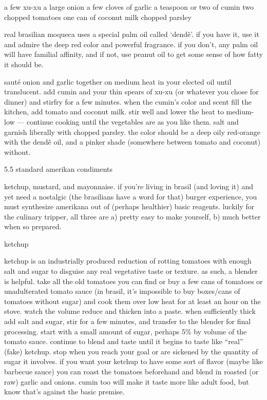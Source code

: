 a few xu-xu
a large onion
a few cloves of garlic
a teaspoon or two of cumin
two chopped tomatoes
one can of coconut milk
chopped parsley

	real brasilian moqueca uses a special palm oil called `dend\^{e}'. if you have it, use it and admire the deep red color and powerful fragrance. if you don't, any palm oil will have familial affinity, and if not, use peanut oil to get some sense of how fatty it should be.

	saut\'{e} onion and garlic together on medium heat in your elected oil until translucent. add cumin and your thin spears of xu-xu (or whatever you chose for dinner) and stirfry for a few minutes. when the cumin's color and scent fill the kitchen, add tomato and coconut milk. stir well and lower the heat to medium-low --- continue cooking until the vegetables are as you like them. salt and garnish liberally with chopped parsley. the color should be a deep oily red-orange with the dend\^{e} oil, and a pinker shade (somewhere between tomato and coconut) without.

5.5  standard amerikan condiments

ketchup, mustard, and mayonnaise. if you're living in brasil (and loving it) and yet need a nostalgic (the brasilians have a word for that) burger experience, you must synthesize amerikana out of (perhaps healthier) basic reagents. luckily for the culinary tripper, all three are a) pretty easy to make yourself, b) much better when so prepared.

ketchup

ketchup is an industrially produced reduction of rotting tomatoes with enough salt and sugar to disguise any real vegetative taste or texture. as such, a blender is helpful. take all the old tomatoes you can find or buy a few cans of tomatoes or unadulterated tomato sauce (in brasil, it's impossible to buy boxes/cans of tomatoes without sugar) and cook them over low heat for at least an hour on the stove. watch the volume reduce and thicken into a paste. when sufficiently thick add salt and sugar, stir for a few minutes, and transfer to the blender for final processing. start with a small amount of sugar, perhaps 5\% by volume of the tomato sauce. continue to blend and taste until it begins to taste like ``real'' (fake) ketchup. stop when you reach your goal or are sickened by the quantity of sugar it involves.
	if you want your ketchup to have some sort of flavor (maybe like barbecue sauce) you can roast the tomatoes beforehand and blend in roasted (or raw) garlic and onions. cumin too will make it taste more like adult food, but know that's against the basic premise.


